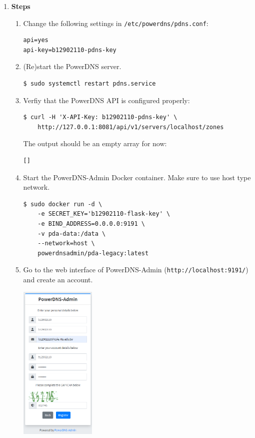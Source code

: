 \documentclass[12pt, a4paper]{article}
\begin{document}
\begin{enumerate}
    \pagebreak
    \item
    \textbf{Steps}
    \begin{enumerate}
      \item Change the following settings in \verb|/etc/powerdns/pdns.conf|:
      \begin{Verbatim}[frame=single]
api=yes
api-key=b12902110-pdns-key
      \end{Verbatim}
      \item (Re)start the PowerDNS server.
      \begin{verbatim}
$ sudo systemctl restart pdns.service
      \end{verbatim}
      \item Verfiy that the PowerDNS API is configured properly:
      \begin{verbatim}
$ curl -H 'X-API-Key: b12902110-pdns-key' \
    http://127.0.0.1:8081/api/v1/servers/localhost/zones
      \end{verbatim}
      The output should be an empty array for now:
      \begin{Verbatim}[frame=single]
[]
      \end{Verbatim}
      \item Start the PowerDNS-Admin Docker container. Make sure to use host type network.
      \begin{verbatim}
$ sudo docker run -d \
    -e SECRET_KEY='b12902110-flask-key' \
    -e BIND_ADDRESS=0.0.0.0:9191 \
    -v pda-data:/data \
    --network=host \
    powerdnsadmin/pda-legacy:latest
      \end{verbatim}
      \item Go to the web interface of PowerDNS-Admin (\verb|http://localhost:9191/|) and create an account.

      \includegraphics[width=0.3\textwidth]{4-2_create_account.png}


\end{enumerate}
\end{enumerate}
\end{document}

